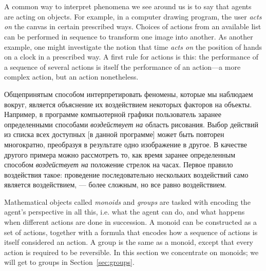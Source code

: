 \documentclass[CT4S-EN-RU]{subfiles}
\begin{document}
\section{}\label{sec:monoids}

\begin{blockENG}
A common way to interpret phenomena we see around us is to say that agents are acting on objects. For example, in a computer drawing program, the user {\em acts on} the canvas in certain prescribed ways. Choices of actions from an available list can be performed in sequence to transform one image into another. As another example, one might investigate the notion that time {\em acts on} the position of hands on a clock in a prescribed way. A first rule for actions is this: the performance of a sequence of several actions is itself the performance of an action—a more complex action, but an action nonetheless.
\end{blockENG}

\begin{blockRUS}
Общепринятым способом интерпретировать феномены, которые мы наблюдаем вокруг, является объяснение их воздействием некоторых факторов на объекты. Например, в программе компьютерной графики пользователь заранее определенными способами {\em воздействует на} область рисования. Выбор действий из списка всех доступных [в данной программе] может быть повторен многократно, преобразуя в результате одно изображение в другое. В качестве другого примера можно рассмотреть то, как время заранее определенным способом {\em воздействует на} положение стрелок на часах. Первое правило воздействия такое: проведение последовательно нескольких воздействий само является воздействием, — более сложным, но все равно воздействием.
\end{blockRUS}

\begin{blockENG}
Mathematical objects called {\em monoids} and {\em groups} are tasked with encoding the agent's perspective in all this, i.e. what the agent can do, and what happens when different actions are done in succession. A monoid can be constructed as a set of actions, together with a formula that encodes how a sequence of actions is itself considered an action. A group is the same as a monoid, except that every action is required to be reversible. In this section we concentrate on monoids; we will get to groups in Section~\ref{sec:groups}.
\end{blockENG}
\end{document}

